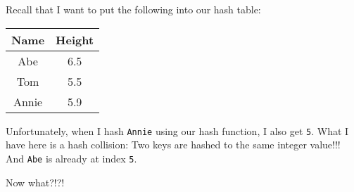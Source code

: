
Recall that I want to put the following into our hash table:
\begin{longtable}{|c|c|}
\hline
Name & Height \\
\hline
Abe &  6.5 \\
Tom &  5.5 \\
Annie &  5.9 \\
\hline
\end{longtable}
Unfortunately, when I hash \verb!Annie! using our
hash function, I also get \verb!5!.
What I have here is a hash collision:
Two keys are hashed to the same integer value!!!
And \verb!Abe! is already at index \verb!5!. 

Now what?!?!




\newpage
